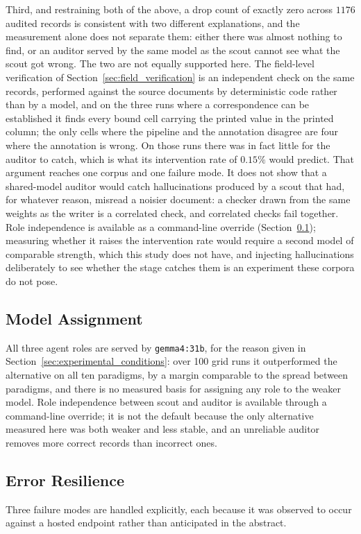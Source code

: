 \documentclass[11pt]{article}
\begin{document}
Third, and restraining both of the above, a drop count of exactly zero across
$1176$ audited records is consistent with two different
explanations, and the measurement alone does not separate them: either there was
almost nothing to find, or an auditor served by the same model as the scout
cannot see what the scout got wrong. The two are not equally supported here. The
field-level verification of Section~\ref{sec:field_verification} is an
independent check on the same records, performed against the source documents by
deterministic code rather than by a model, and on the three runs where a
correspondence can be established it finds every bound cell carrying the printed
value in the printed column; the only cells where the pipeline and the
annotation disagree are four where the annotation is wrong. On those runs there
was in fact little for the auditor to catch, which is what its
intervention rate of $0.15\%$ would predict. That argument reaches one corpus and
one failure mode. It does not show that a shared-model auditor would catch
hallucinations produced by a scout that had, for whatever reason, misread a
noisier document: a checker drawn from the same weights as the writer is a
correlated check, and correlated checks fail together. Role independence is
available as a command-line override
(Section~\ref{sec:model_assignment}); measuring whether it raises the
intervention rate would require a second model of comparable strength, which
this study does not have, and injecting hallucinations deliberately to see
whether the stage catches them is an experiment these corpora do not pose.

\subsection{Model Assignment}
\label{sec:model_assignment}
All three agent roles are served by \texttt{gemma4:31b}, for the reason given in
Section~\ref{sec:experimental_conditions}: over 100 grid runs it outperformed the
alternative on all ten paradigms, by a margin comparable to the spread between
paradigms, and there is no measured basis for assigning any role to the weaker
model. Role independence between scout and auditor is available through a
command-line override; it is not the default because the only alternative
measured here was both weaker and less stable, and an unreliable auditor removes
more correct records than incorrect ones.

\subsection{Error Resilience}
\label{sec:resilience}
Three failure modes are handled explicitly, each because it was observed to occur
against a hosted endpoint rather than anticipated in the abstract.
\end{document}
